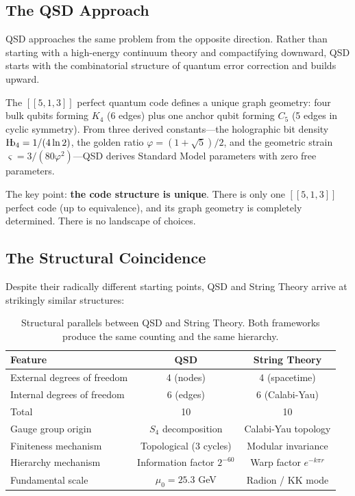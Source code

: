 \documentclass[11pt,a4paper]{article}
\theoremstyle{definition}
\newcommand{\Hb}{\textnormal{H\kern-0.3em b}}
\newcommand{\Hbfour}{\Hb_4}
\newcommand{\strain}{\varsigma}            %
\newcommand{\gr}{\varphi}
\newcommand{\murad}{\mu_0}
\begin{document}
\subsection{The QSD Approach}

QSD approaches the same problem from the opposite direction.  Rather than
starting with a high-energy continuum theory and compactifying downward,
QSD starts with the combinatorial structure of quantum error correction
and builds upward.

The $[[5,1,3]]$ perfect quantum code defines a unique graph geometry:
four bulk qubits forming $K_4$ (6 edges) plus one anchor qubit forming
$C_5$ (5 edges in cyclic symmetry).  From three derived constants---the
holographic bit density $\Hbfour = 1/(4\ln 2)$, the golden ratio
$\gr=(1+\sqrt{5})/2$, and the geometric strain $\strain =
3/(80\gr^2)$---QSD derives Standard Model parameters with zero free
parameters.

The key point: \textbf{the code structure is unique}.  There is only one
$[[5,1,3]]$ perfect code (up to equivalence), and its graph geometry is
completely determined.  There is no landscape of choices.

\subsection{The Structural Coincidence}

Despite their radically different starting points, QSD and String Theory
arrive at strikingly similar structures:

\begin{table}[h]
\centering
\begin{tabular}{lcc}
\toprule
\textbf{Feature} & \textbf{QSD} & \textbf{String Theory} \\
\midrule
External degrees of freedom & 4 (nodes) & 4 (spacetime) \\
Internal degrees of freedom & 6 (edges) & 6 (Calabi-Yau) \\
Total & 10 & 10 \\
Gauge group origin & $S_4$ decomposition & Calabi-Yau topology \\
Finiteness mechanism & Topological (3 cycles) & Modular invariance \\
Hierarchy mechanism & Information factor $2^{-60}$ & Warp factor $e^{-k\pi r}$ \\
Fundamental scale & $\murad = 25.3$ GeV & Radion / KK mode \\
\bottomrule
\end{tabular}
\caption{Structural parallels between QSD and String Theory.  Both frameworks produce the same counting and the same hierarchy.}
\label{tab:parallels}
\end{table}
\end{document}
